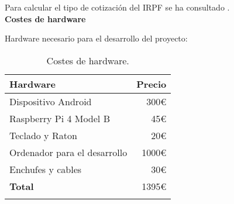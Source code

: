 Para calcular el tipo de cotización del IRPF se ha consultado \cite{irpfgob}.\\

\textbf{Costes de hardware}

Hardware necesario para el desarrollo del proyecto:

\begin{longtable}[]{@{}lr@{}}
\toprule
\begin{minipage}[b]{0.38\columnwidth}\raggedright\strut
\textbf{Hardware}\strut
\end{minipage} & \begin{minipage}[b]{0.20\columnwidth}\raggedright\strut
\textbf{Precio}\strut
\end{minipage}\tabularnewline
\midrule
\endhead
\begin{minipage}[t]{0.38\columnwidth}\raggedright\strut
Dispositivo Android\strut
\end{minipage} & \begin{minipage}[t]{0.20\columnwidth}\raggedright\strut
300\euro{}\strut
\end{minipage}\tabularnewline
\begin{minipage}[t]{0.38\columnwidth}\raggedright\strut
Raspberry Pi 4 Model B\strut
\end{minipage} & \begin{minipage}[t]{0.20\columnwidth}\raggedright\strut
45\euro{}\strut
\end{minipage}\tabularnewline
\begin{minipage}[t]{0.38\columnwidth}\raggedright\strut
Teclado y Raton\strut
\end{minipage} & \begin{minipage}[t]{0.20\columnwidth}\raggedright\strut
20\euro{}\strut
\end{minipage}\tabularnewline
\begin{minipage}[t]{0.38\columnwidth}\raggedright\strut
Ordenador para el desarrollo\strut
\end{minipage} & \begin{minipage}[t]{0.20\columnwidth}\raggedright\strut
1000\euro{}\strut
\end{minipage}\tabularnewline
\begin{minipage}[t]{0.38\columnwidth}\raggedright\strut
Enchufes y cables\strut
\end{minipage} & \begin{minipage}[t]{0.20\columnwidth}\raggedright\strut
30\euro{}\strut
\end{minipage}\tabularnewline
\midrule
\begin{minipage}[t]{0.38\columnwidth}\raggedright\strut
\textbf{Total}\strut
\end{minipage} & \begin{minipage}[t]{0.20\columnwidth}\raggedright\strut
1395\euro{}\strut
\end{minipage}\tabularnewline
\bottomrule
\caption{Costes de hardware.}
\end{longtable}

